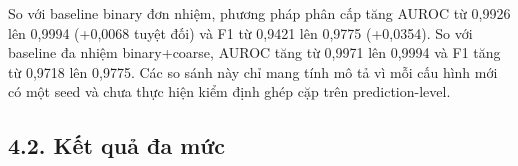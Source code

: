 \documentclass[
  10pt,
  a4paper,
  twocolumn]{article}
\begin{document}
\begin{table}[htbp]
\centering
\caption{Hiệu năng phát hiện ROI ở mức nhị phân trên tập test 329 ảnh.}
\label{tab:table5}
\vspace{2pt}
\end{table}

So với baseline binary đơn nhiệm, phương pháp phân cấp tăng AUROC từ
0,9926 lên 0,9994 (+0,0068 tuyệt đối) và F1 từ 0,9421 lên 0,9775
(+0,0354). So với baseline đa nhiệm binary+coarse, AUROC tăng từ 0,9971
lên 0,9994 và F1 tăng từ 0,9718 lên 0,9775. Các so sánh này chỉ mang
tính mô tả vì mỗi cấu hình mới có một seed và chưa thực hiện kiểm định
ghép cặp trên prediction-level.

\subsection{4.2. Kết quả đa
mức}\label{kux1ebft-quux1ea3-ux111a-mux1ee9c}
\end{document}
